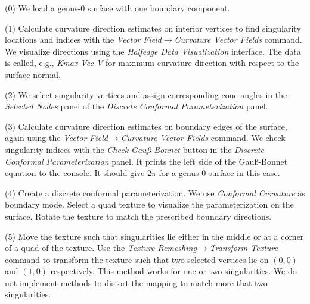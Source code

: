 \documentclass[Thesis.tex]{subfiles}
\begin{document}
\begin{compactenum}[(1)]
\item[(0)] We load a genus-$0$ surface with one boundary component.
\item[(1)] Calculate curvature direction estimates on interior vertices to find singularity locations and indices with the \emph{Vector Field$\to$Curvature Vector Fields} command. We visualize directions using the \emph{Halfedge Data Visualization} interface. The data is called, e.g., \emph{Kmax Vec V} for maximum curvature direction with respect to the surface normal.
\item[(2)] We select singularity vertices and assign corresponding cone angles in the \emph{Selected Nodes} panel of the \emph{Discrete Conformal Parameterization} panel.
\item[(3)] Calculate curvature direction estimates on boundary edges of the surface, again using the \emph{Vector Field$\to$Curvature Vector Fields} command. We check singularity indices with the \emph{Check Gau{\ss}-Bonnet} button in the \emph{Discrete Conformal Parameterization} panel. It prints the left side of the Gau{\ss}-Bonnet equation to the console. It should give $2\pi$ for a genus $0$ surface in this case.

\begin{center}
\begin{minipage}{\linewidth}
            \centering
\end{minipage}
\end{center}     
            
\item[(4)] Create a discrete conformal parameterization. We use \emph{Conformal Curvature} as boundary mode. Select a quad texture to visualize the parameterization on the surface. Rotate the texture to match the prescribed boundary directions.
\item[(5)] Move the texture such that singularities lie either in the middle or at a corner of a quad of the texture. Use the \emph{Texture Remeshing$\to$Transform Texture} command to transform the texture such that two selected vertices lie on $(0,0)$ and $(1,0)$ respectively. This method works for one or two singularities. We do not implement methods to distort the mapping to match more that two singularities.


\end{compactenum}
\end{document}
